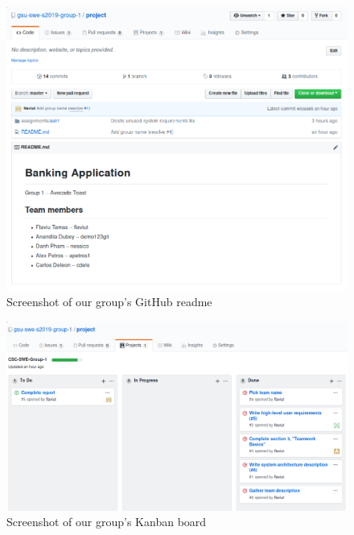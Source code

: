 \documentclass[
10pt, %
letterpaper, %
oneside, %
headinclude,footinclude, %
BCOR5mm, %
]{scrartcl}
\begin{document}
\begin{figure}[H]
  \centering
    \includegraphics[width=\textwidth]{github_readme.png}
  \caption{Screenshot of our group's GitHub readme}
\end{figure}

\begin{figure}[H]
  \centering
    \includegraphics[width=\textwidth]{github_project.png}
  \caption{Screenshot of our group's Kanban board}
\end{figure}
\end{document}
